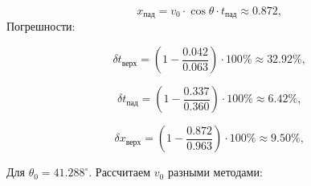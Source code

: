\documentclass{report}
\begin{document}
\begin{enumerate}
\begin{equation}
  x_{\text{пад}} = v_0\cdot\cos{\theta}\cdot t_{\text{пад}} \approx 0.872\text{,}
\end{equation}
Погрешности:

\begin{equation}
  \delta t_{\text{верх}} = (1 - \dfrac{0.042}{0.063}) \cdot 100 \% \approx 32.92\% \text{,}
\end{equation}

\begin{equation}
  \delta t_{\text{пад}} = (1 - \dfrac{0.337}{0.360}) \cdot 100 \% \approx 6.42\% \text{,}
\end{equation}

\begin{equation}
  \delta x_{\text{верх}} = (1 - \dfrac{0.872}{0.963}) \cdot 100 \% \approx 9.50\% \text{,}
\end{equation}
\end{enumerate}

Для $\theta_0= 41.288^{\circ}$. Рассчитаем $v_0$ разными методами:
\end{document}
